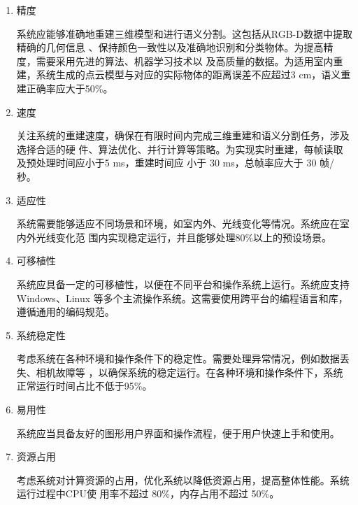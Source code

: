 \begin{enumerate}
	\item{精度}
	\par 系统应能够准确地重建三维模型和进行语义分割。这包括从RGB-D数据中提取精确的几何信息
	、保持颜色一致性以及准确地识别和分类物体。为提高精度，需要采用先进的算法、机器学习技术以
	及高质量的数据。为适用室内重建，系统生成的点云模型与对应的实际物体的距离误差不应超过3 cm，语义重建正确率应大于50\%。

	\item{速度}
	\par 关注系统的重建速度，确保在有限时间内完成三维重建和语义分割任务，涉及选择合适的硬
	件、算法优化、并行计算等策略。为实现实时重建，每帧读取及预处理时间应小于5 ms，重建时间应
	小于 30 ms，总帧率应大于 30 帧/秒。

	\item{适应性}
	\par 系统需要能够适应不同场景和环境，如室内外、光线变化等情况。系统应在室内外光线变化范
	围内实现稳定运行，并且能够处理80\%以上的预设场景。



	\item{可移植性}
	\par 系统应具备一定的可移植性，以便在不同平台和操作系统上运行。系统应支持Windows、Linux
	等多个主流操作系统。这需要使用跨平台的编程语言和库，遵循通用的编码规范。

	\item{系统稳定性}
	\par 考虑系统在各种环境和操作条件下的稳定性。需要处理异常情况，例如数据丢失、相机故障等
	，以确保系统的稳定运行。在各种环境和操作条件下，系统正常运行时间占比不低于95\%。

	\item{易用性}
	\par 系统应当具备友好的图形用户界面和操作流程，便于用户快速上手和使用。

	\item{资源占用}
	\par 考虑系统对计算资源的占用，优化系统以降低资源占用，提高整体性能。系统运行过程中CPU使
	用率不超过 80\%，内存占用不超过 50\%。

\end{enumerate}


